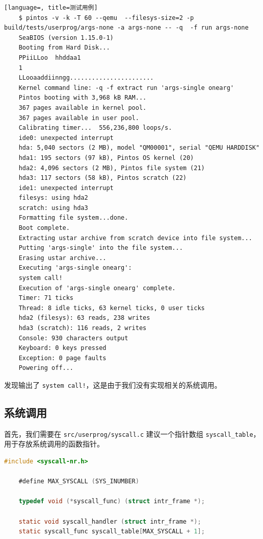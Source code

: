 \documentclass{article}
\begin{document}
\begin{lstlisting}[language=, title=测试用例]
    $ pintos -v -k -T 60 --qemu  --filesys-size=2 -p build/tests/userprog/args-none -a args-none -- -q  -f run args-none
    SeaBIOS (version 1.15.0-1)
    Booting from Hard Disk...
    PPiiLLoo  hhddaa1
    1
    LLooaaddiinngg.......................
    Kernel command line: -q -f extract run 'args-single onearg'
    Pintos booting with 3,968 kB RAM...
    367 pages available in kernel pool.
    367 pages available in user pool.
    Calibrating timer...  556,236,800 loops/s.
    ide0: unexpected interrupt
    hda: 5,040 sectors (2 MB), model "QM00001", serial "QEMU HARDDISK"
    hda1: 195 sectors (97 kB), Pintos OS kernel (20)
    hda2: 4,096 sectors (2 MB), Pintos file system (21)
    hda3: 117 sectors (58 kB), Pintos scratch (22)
    ide1: unexpected interrupt
    filesys: using hda2
    scratch: using hda3
    Formatting file system...done.
    Boot complete.
    Extracting ustar archive from scratch device into file system...
    Putting 'args-single' into the file system...
    Erasing ustar archive...
    Executing 'args-single onearg':
    system call!
    Execution of 'args-single onearg' complete.
    Timer: 71 ticks
    Thread: 8 idle ticks, 63 kernel ticks, 0 user ticks
    hda2 (filesys): 63 reads, 238 writes
    hda3 (scratch): 116 reads, 2 writes
    Console: 930 characters output
    Keyboard: 0 keys pressed
    Exception: 0 page faults
    Powering off...
\end{lstlisting}

发现输出了 \texttt{system call!}，这是由于我们没有实现相关的系统调用。

\subsection{系统调用}

首先，我们需要在 \texttt{src/userprog/syscall.c} 建议一个指针数组 \texttt{syscall\_table}，用于存放系统调用的函数指针。

\begin{lstlisting}[language=C, title=\texttt{src/userprog/syscall.c}]
    #include <syscall-nr.h>

    #define MAX_SYSCALL (SYS_INUMBER)
    
    typedef void (*syscall_func) (struct intr_frame *);
    
    static void syscall_handler (struct intr_frame *);
    static syscall_func syscall_table[MAX_SYSCALL + 1];
\end{lstlisting}
\end{document}
